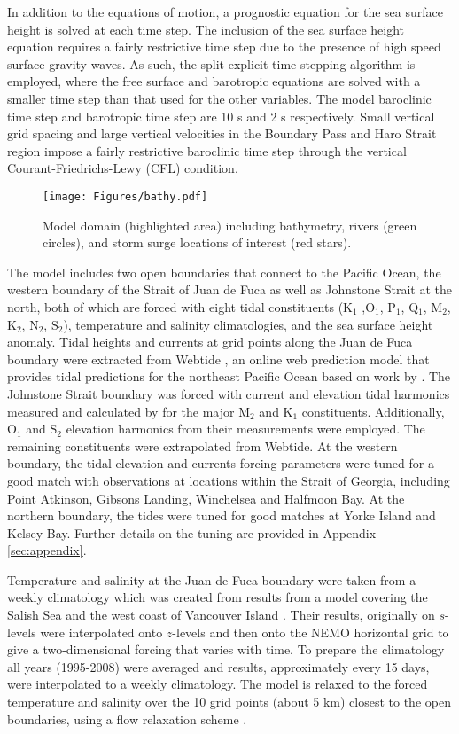 \documentclass{tATO2e}
\begin{document}
In addition to the equations of motion, a prognostic equation for the sea surface height is solved at each time step. The inclusion of the sea surface height equation requires a fairly restrictive time step due to the presence of high speed surface gravity waves. As such, the split-explicit time stepping algorithm is employed, where the free surface and barotropic equations are solved with a smaller time step than that used for the other variables. The model baroclinic time step and barotropic time step are 10 s and 2 s respectively. Small vertical grid spacing and large vertical velocities in the Boundary Pass and Haro Strait region impose a fairly restrictive baroclinic time step through the vertical Courant-Friedrichs-Lewy (CFL) condition.


\begin{figure}[h]
\centering
\texttt{[image: Figures/bathy.pdf]}
\caption{Model domain (highlighted area) including bathymetry, rivers (green circles), and storm surge locations of interest  (red stars).}\label{fig:domain}
\end{figure}


The model includes two open boundaries that connect to the Pacific Ocean, the western boundary of the Strait of Juan de Fuca as well as Johnstone Strait at the north, both of which are forced with eight tidal constituents (K$_1$ ,O$_1$, P$_1$, Q$_1$, M$_2$, K$_2$, N$_2$, S$_2$), temperature and salinity climatologies, and the sea surface height anomaly. Tidal heights and currents at grid points along the Juan de Fuca boundary were extracted from Webtide \citep{webtide}, an online web prediction model that provides tidal predictions for the northeast Pacific Ocean based on work by \citet{foreman2000webtide}. The Johnstone Strait boundary was forced with current and elevation tidal harmonics measured and calculated by \citet{thomson1980johnstone} for the major M$_2$ and K$_1$ constituents. Additionally, O$_1$ and S$_2$ elevation harmonics from their measurements were employed. The remaining constituents were extrapolated from Webtide. At the western boundary, the tidal elevation and currents forcing parameters were tuned for a good match with observations at locations within the Strait of Georgia, including Point Atkinson, Gibsons Landing, Winchelsea and Halfmoon Bay. At the northern boundary, the tides were tuned for good matches at Yorke Island and Kelsey Bay. Further details on the tuning are provided in Appendix \ref{sec:appendix}. 

Temperature and salinity at the Juan de Fuca boundary were taken from a weekly climatology which was created from results from a model covering the Salish Sea and the west coast of Vancouver Island \citep{massonfine2012}.  Their results, originally on $s$-levels were interpolated onto $z$-levels and then onto the NEMO horizontal grid to give a two-dimensional forcing that varies with time.  To prepare the climatology all years (1995-2008) were averaged and results, approximately every 15 days, were interpolated to a weekly climatology. The model is relaxed to the forced temperature and salinity over the 10 grid points (about 5 km) closest to the open boundaries, using a flow relaxation scheme \citep{engedahl1995use}. %
\end{document}
